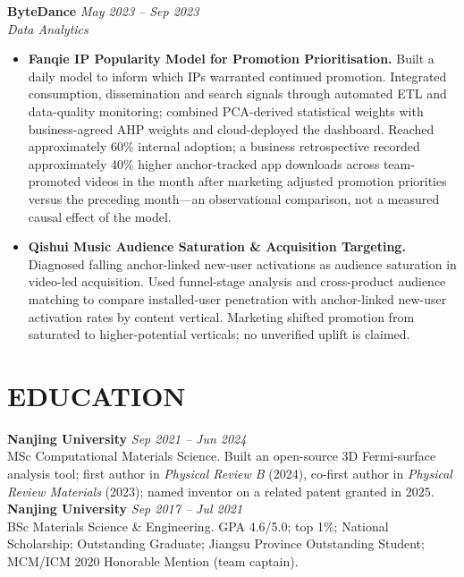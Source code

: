 \documentclass[a4paper,10pt]{article}
\begin{document}
\textbf{ByteDance} \hfill \textit{May 2023 -- Sep 2023}\\
\textit{Data Analytics}
\begin{itemize}
\item \textbf{Fanqie IP Popularity Model for Promotion Prioritisation.} Built a daily model to inform which IPs warranted continued promotion. Integrated consumption, dissemination and search signals through automated ETL and data-quality monitoring; combined PCA-derived statistical weights with business-agreed AHP weights and cloud-deployed the dashboard. Reached approximately 60\% internal adoption; a business retrospective recorded approximately 40\% higher anchor-tracked app downloads across team-promoted videos in the month after marketing adjusted promotion priorities versus the preceding month---an observational comparison, not a measured causal effect of the model.
\item \textbf{Qishui Music Audience Saturation \& Acquisition Targeting.} Diagnosed falling anchor-linked new-user activations as audience saturation in video-led acquisition. Used funnel-stage analysis and cross-product audience matching to compare installed-user penetration with anchor-linked new-user activation rates by content vertical. Marketing shifted promotion from saturated to higher-potential verticals; no unverified uplift is claimed.
\end{itemize}

\section{EDUCATION}
\textbf{Nanjing University} \hfill \textit{Sep 2021 -- Jun 2024}\\
MSc Computational Materials Science. Built an open-source 3D Fermi-surface analysis tool; first author in \textit{Physical Review B} (2024), co-first author in \textit{Physical Review Materials} (2023); named inventor on a related patent granted in 2025.\\[1pt]
\textbf{Nanjing University} \hfill \textit{Sep 2017 -- Jul 2021}\\
BSc Materials Science \& Engineering. GPA 4.6/5.0; top 1\%; National Scholarship; Outstanding Graduate; Jiangsu Province Outstanding Student; MCM/ICM 2020 Honorable Mention (team captain).
\end{document}
